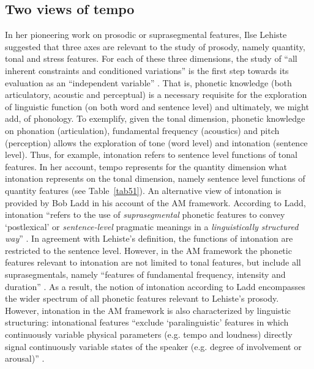 \subsection{Two views of tempo}\label{sec511}
In her pioneering work on prosodic or suprasegmental features, Ilse Lehiste suggested that three axes are relevant to the study of prosody, namely quantity, tonal and stress features. For each of these three dimensions, the study of ``all inherent constraints and conditioned variations'' is the first step towards its evaluation as an ``independent variable'' \cite[3]{lehiste1970suprasegmentals}. That is, phonetic knowledge (both articulatory, acoustic and perceptual) is a necessary requisite for the exploration of linguistic function (on both word and sentence level) and ultimately, we might add, of phonology. To exemplify, given the tonal dimension, phonetic knowledge on phonation (articulation), fundamental frequency (acoustics) and pitch (perception) allows the exploration of tone (word level) and intonation (sentence level). Thus, for example, intonation refers to sentence level functions of tonal features. In her account, tempo represents for the quantity dimension what intonation represents on the tonal dimension, namely sentence level functions of quantity features (see Table~\ref{tab51}).
An alternative view of intonation is provided by Bob Ladd in his account of the AM framework. According to Ladd, intonation ``refers to the use of \textit{suprasegmental} phonetic features to convey `postlexical' or \textit{sentence-level} pragmatic meanings in a \textit{linguistically structured way}'' \cite[4; original emphasis]{ladd2008intonational}. In agreement with Lehiste's definition, the functions of intonation are restricted to the sentence level. However, in the AM framework the phonetic features relevant to intonation are not limited to tonal features, but include all suprasegmentals, namely ``features of fundamental frequency, intensity and duration'' \cite[ibid.]{ladd2008intonational}. As a result, the notion of intonation according to Ladd encompasses the wider spectrum of all phonetic features relevant to Lehiste's prosody. However, intonation in the AM framework is also characterized by linguistic structuring: intonational features ``exclude `paralinguistic' features in which continuously variable physical parameters (e.g. tempo and loudness) directly signal continuously variable states of the speaker (e.g. degree of involvement or arousal)'' \cite[6]{ladd2008intonational}.

